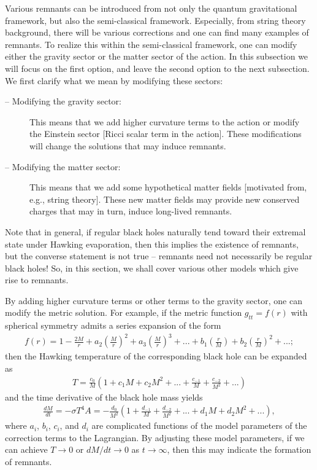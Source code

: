 \documentclass[12pt]{article}
\newcommand{\2}{$^2$}
\newcommand{\3}{$^3$}
\newcommand{\4}{$_4$}
\newcommand{\5}{$_5$}
\begin{document}
Various remnants can be introduced from not only the quantum gravitational framework, but also the semi-classical framework. Especially, from string theory background, there will be various corrections and one can find many examples of remnants. To realize this within the semi-classical framework, one can modify either the gravity sector or the matter sector of the action. In this subsection we will focus on the first option, and leave the second option to the next subsection. We first clarify what we mean by modifying these sectors:
\begin{description}
\item[-- Modifying the gravity sector:] This means that we add higher curvature terms to the action or modify the Einstein sector [Ricci scalar term in the action]. These modifications will change the solutions that may induce remnants.
\item[-- Modifying the matter sector:] This means that we add some hypothetical matter fields [motivated from, e.g., string theory]. These new matter fields may provide new conserved charges that may in turn, induce long-lived remnants.
\end{description}
Note that in general, if regular black holes naturally tend toward their extremal state under Hawking evaporation, then this implies the existence of remnants, but the converse statement is not true -- remnants need not necessarily be regular black holes! So, in this section, we shall cover various other models which give rise to remnants.

By adding higher curvature terms or other terms to the gravity sector, one can modify the metric solution. For example, if the metric function $g_{tt}=f(r)$ with spherical symmetry admits a series expansion of the form
\begin{eqnarray}
f(r) = 1 - \frac{2M}{r} + a_{2} \left( \frac{M}{r} \right)^{2} + a_{3} \left( \frac{M}{r} \right)^{3} + ... + b_{1}\left( \frac{r}{M} \right)+ b_{2} \left( \frac{r}{M} \right)^{2} + ...;
\end{eqnarray}
then the Hawking temperature of the corresponding black hole can be expanded as
\begin{eqnarray}
T = \frac{c_{0}}{M} \left( 1 + c_{1} M + c_{2} M^{2} + ... + \frac{c_{-1}}{M} + \frac{c_{-2}}{M^{2}} + ... \right)
\end{eqnarray}
and the time derivative of the black hole mass yields \cite{Barrow:1992hq}
\begin{eqnarray}
\frac{dM}{dt} = -\sigma T^{4} A = -\frac{d_{0}}{M^{2}} \left( 1 + \frac{d_{-1}}{M} + \frac{d_{-2}}{M^{2}} + ... + d_{1} M + d_{2} M^{2} + ... \right),
\end{eqnarray}
where $a_{i}$, $b_{i}$, $c_{i}$, and $d_{i}$ are complicated functions of the model parameters of the correction terms to the Lagrangian. By adjusting these model parameters, if we can achieve $T \rightarrow 0$ or $dM/dt \rightarrow 0$ as $t \to \infty$, then this may indicate the formation of remnants.
\end{document}
